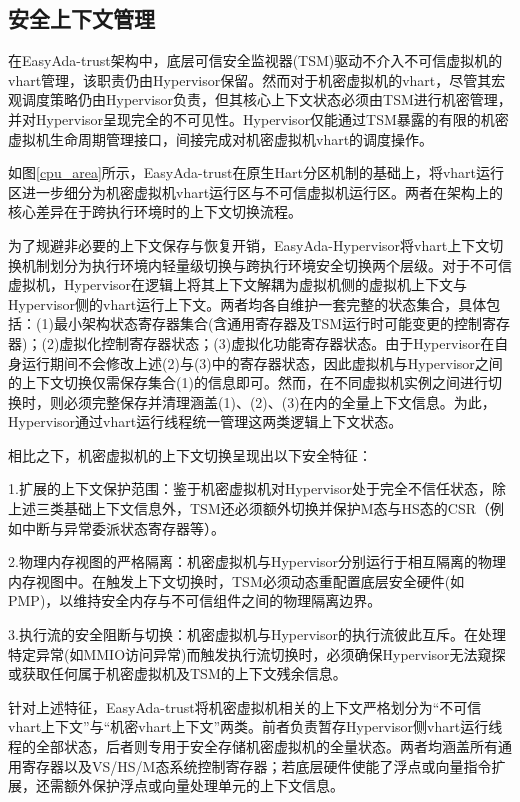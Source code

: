 \documentclass[master, vlined, review]{DissertUESTC}
\begin{document}
	\subsection{安全上下文管理}
	在EasyAda-trust架构中，底层可信安全监视器(TSM)驱动不介入不可信虚拟机的vhart管理，该职责仍由Hypervisor保留。然而对于机密虚拟机的vhart，尽管其宏观调度策略仍由Hypervisor负责，但其核心上下文状态必须由TSM进行机密管理，并对Hypervisor呈现完全的不可见性。Hypervisor仅能通过TSM暴露的有限的机密虚拟机生命周期管理接口，间接完成对机密虚拟机vhart的调度操作。
	
	如图\ref{cpu_area}所示，EasyAda-trust在原生Hart分区机制的基础上，将vhart运行区进一步细分为机密虚拟机vhart运行区与不可信虚拟机运行区。两者在架构上的核心差异在于跨执行环境时的上下文切换流程。

	为了规避非必要的上下文保存与恢复开销，EasyAda-Hypervisor将vhart上下文切换机制划分为执行环境内轻量级切换与跨执行环境安全切换两个层级。对于不可信虚拟机，Hypervisor在逻辑上将其上下文解耦为虚拟机侧的虚拟机上下文与Hypervisor侧的vhart运行上下文。两者均各自维护一套完整的状态集合，具体包括：(1)最小架构状态寄存器集合(含通用寄存器及TSM运行时可能变更的控制寄存器)；(2)虚拟化控制寄存器状态；(3)虚拟化功能寄存器状态。由于Hypervisor在自身运行期间不会修改上述(2)与(3)中的寄存器状态，因此虚拟机与Hypervisor之间的上下文切换仅需保存集合(1)的信息即可。然而，在不同虚拟机实例之间进行切换时，则必须完整保存并清理涵盖(1)、(2)、(3)在内的全量上下文信息。为此，Hypervisor通过vhart运行线程统一管理这两类逻辑上下文状态。
	
	相比之下，机密虚拟机的上下文切换呈现出以下安全特征：
	
	1.扩展的上下文保护范围：鉴于机密虚拟机对Hypervisor处于完全不信任状态，除上述三类基础上下文信息外，TSM还必须额外切换并保护M态与HS态的CSR（例如中断与异常委派状态寄存器等）。
		
	2.物理内存视图的严格隔离：机密虚拟机与Hypervisor分别运行于相互隔离的物理内存视图中。在触发上下文切换时，TSM必须动态重配置底层安全硬件(如PMP)，以维持安全内存与不可信组件之间的物理隔离边界。
		
	3.执行流的安全阻断与切换：机密虚拟机与Hypervisor的执行流彼此互斥。在处理特定异常(如MMIO访问异常)而触发执行流切换时，必须确保Hypervisor无法窥探或获取任何属于机密虚拟机及TSM的上下文残余信息。
		
	针对上述特征，EasyAda-trust将机密虚拟机相关的上下文严格划分为“不可信vhart上下文”与“机密vhart上下文”两类。前者负责暂存Hypervisor侧vhart运行线程的全部状态，后者则专用于安全存储机密虚拟机的全量状态。两者均涵盖所有通用寄存器以及VS/HS/M态系统控制寄存器；若底层硬件使能了浮点或向量指令扩展，还需额外保护浮点或向量处理单元的上下文信息。
	
\end{document}

